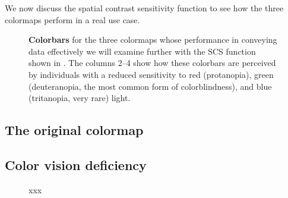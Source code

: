 We now discuss the spatial contrast sensitivity function to see how the three colormaps perform in a real use case.


\begin{figure}
	\centering
	
	\caption{\textbf{Colorbars} for the three colormaps whose performance in conveying data effectively we will examine further with the SCS function shown in . The columns 2--4 show how these colorbars are perceived by individuals with a reduced sensitivity to red (protanopia), green (deuteranopia, the most common form of colorblindness), and blue (tritanopia, very rare) light.}
	\label{fig:colorbars}
\end{figure}


\subsection{The original colormap}
\subsection{Color vision deficiency}





\begin{figure}
	\centering
	
	\caption{xxx}
	\label{fig:sensitivityCVD}
\end{figure}

% 	





